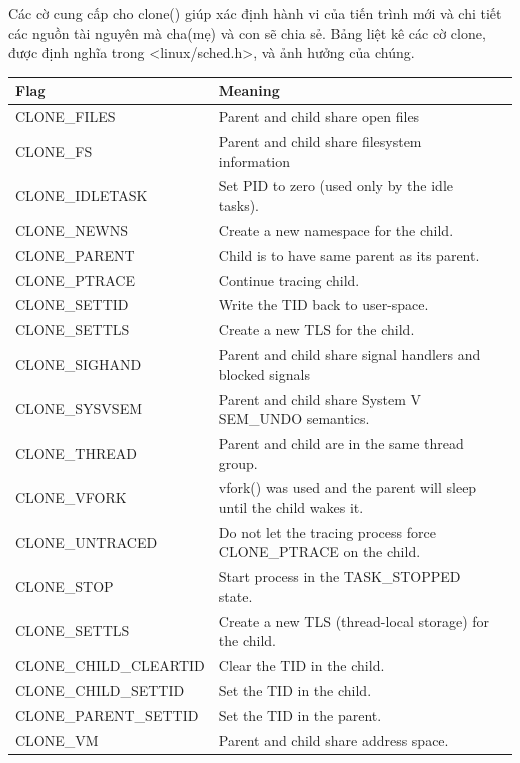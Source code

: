 \documentclass[a4paper,10pt]{report}
\begin{document}
Các cờ cung cấp cho clone() giúp xác định hành vi của tiến trình mới và chi tiết các nguồn tài nguyên mà cha(mẹ) và con sẽ chia sẻ. Bảng liệt kê các cờ clone, được định nghĩa trong <linux/sched.h>, và ảnh hưởng của chúng. \\
\begin{center}
\begin{tabularx}{\textwidth}{XXX}
\hline
\textbf{Flag} & \textbf{Meaning} \\
\hline
CLONE\_FILES & Parent and child share open files\\
\hline
CLONE\_FS & Parent and child share filesystem information\\
\hline
CLONE\_IDLETASK & Set PID to zero (used only by the idle tasks).\\
\hline
CLONE\_NEWNS & Create a new namespace for the child. \\
\hline
CLONE\_PARENT & Child is to have same parent as its parent. \\
\hline
CLONE\_PTRACE & Continue tracing child. \\
\hline
CLONE\_SETTID & Write the TID back to user-space. \\ 
\hline
CLONE\_SETTLS & Create a new TLS for the child. \\
\hline
CLONE\_SIGHAND & Parent and child share signal handlers and blocked signals \\
\hline
CLONE\_SYSVSEM & Parent and child share System V SEM\_UNDO semantics. \\
\hline
CLONE\_THREAD & Parent and child are in the same thread group. \\
\hline
CLONE\_VFORK & vfork() was used and the parent will sleep until the child
wakes it. \\
\hline
CLONE\_UNTRACED & Do not let the tracing process force CLONE\_PTRACE on the
child. \\
\hline
CLONE\_STOP & Start process in the TASK\_STOPPED state. \\
\hline
CLONE\_SETTLS & Create a new TLS (thread-local storage) for the child. \\
\hline
CLONE\_CHILD\_CLEARTID & Clear the TID in the child. \\
\hline
CLONE\_CHILD\_SETTID & Set the TID in the child. \\
\hline
CLONE\_PARENT\_SETTID & Set the TID in the parent. \\ 
\hline
CLONE\_VM & Parent and child share address space. \\
\hline
\end{tabularx}
\end{center}
\end{document}
